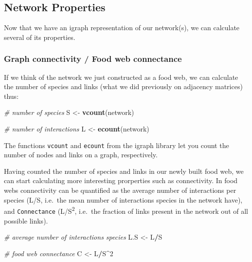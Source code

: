 \documentclass[
]{article}
\newenvironment{Shaded}{\begin{snugshade}}{\end{snugshade}}
\newcommand{\CommentTok}[1]{\textcolor[rgb]{0.56,0.35,0.01}{\textit{#1}}}
\newcommand{\DecValTok}[1]{\textcolor[rgb]{0.00,0.00,0.81}{#1}}
\newcommand{\FunctionTok}[1]{\textcolor[rgb]{0.13,0.29,0.53}{\textbf{#1}}}
\newcommand{\NormalTok}[1]{#1}
\newcommand{\OtherTok}[1]{\textcolor[rgb]{0.56,0.35,0.01}{#1}}
\newcommand{\SpecialCharTok}[1]{\textcolor[rgb]{0.81,0.36,0.00}{\textbf{#1}}}
\begin{document}
\subsection{Network Properties}\label{network-properties}

Now that we have an igraph representation of our network(s), we can
calculate several of its properties.

\subsubsection{Graph connectivity / Food web
connectance}\label{graph-connectivity-food-web-connectance}

If we think of the network we just constructed as a food web, we can
calculate the number of species and links (what we did previously on
adjacency matrices) thus:

\begin{Shaded}
\begin{Highlighting}[]
\CommentTok{\# number of species}
\NormalTok{S }\OtherTok{\textless{}{-}} \FunctionTok{vcount}\NormalTok{(network)}

\CommentTok{\# number of interactions}
\NormalTok{L }\OtherTok{\textless{}{-}} \FunctionTok{ecount}\NormalTok{(network)}
\end{Highlighting}
\end{Shaded}

The functions \texttt{vcount} and \texttt{ecount} from the igraph
library let you count the number of nodes and links on a graph,
respectively.

Having counted the number of species and links in our newly built food
web, we can start calculating more interesting prorperties such as
connectivity. In food webs connectivity can be quantified as the average
number of interactions per species (L/S, i.e.~the mean number of
interactions species in the network have), and \texttt{Connectance}
(L/S\textsuperscript{2}, i.e.~the fraction of links present in the
network out of all possible links).

\begin{Shaded}
\begin{Highlighting}[]
\CommentTok{\# average number of interactions species}
\NormalTok{L.S }\OtherTok{\textless{}{-}}\NormalTok{ L}\SpecialCharTok{/}\NormalTok{S}

\CommentTok{\# food web connectance}
\NormalTok{C }\OtherTok{\textless{}{-}}\NormalTok{ L}\SpecialCharTok{/}\NormalTok{S}\SpecialCharTok{\^{}}\DecValTok{2}
\end{Highlighting}
\end{Shaded}
\end{document}
